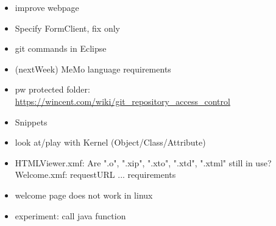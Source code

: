\begin{itemize}
\item improve webpage
\item Specify FormClient, fix only
\item git commands in Eclipse
\item (nextWeek) MeMo language requirements
\item pw protected folder: \url{https://wincent.com/wiki/git_repository_access_control}
\item Snippets
\item look at/play with Kernel (Object/Class/Attribute)
\item HTMLViewer.xmf: Are ".o", ".xip", ".xto", ".xtd", ".xtml" still in use?
Welcome.xmf: requestURL ...
requirements
\item welcome page does not work in linux
\item experiment: call java function

\end{itemize}
